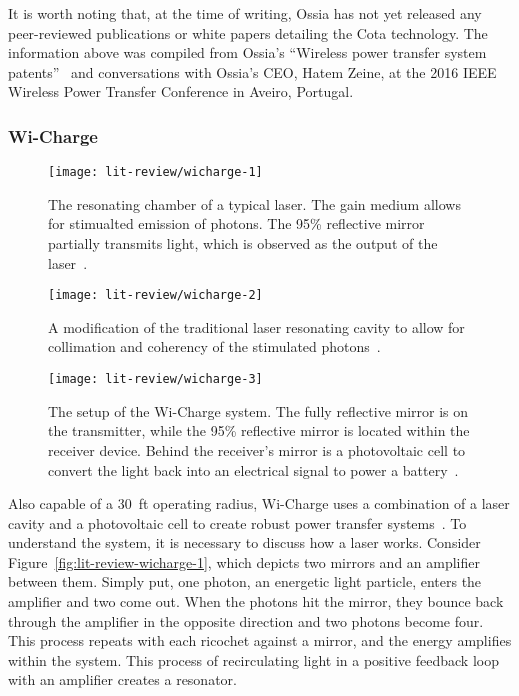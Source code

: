 It is worth noting that, at the time of writing, Ossia has not yet released any peer-reviewed publications or white papers detailing the Cota technology. The information above was compiled from Ossia's ``Wireless power transfer system patents''~\cite{cota-patent} and conversations with Ossia's CEO, Hatem Zeine, at the 2016 IEEE Wireless Power Transfer Conference in Aveiro, Portugal.

\subsubsection{Wi-Charge}

\begin{figure}
\centering
\texttt{[image: lit-review/wicharge-1]}
    \caption[Wi-Charge: Typical laser]{The resonating chamber of a typical laser. The gain medium allows for stimualted emission of photons. The 95\% reflective mirror partially transmits light, which is observed as the output of the laser~\cite{wicharge2016}.}
    \label{fig:lit-review-wicharge-1}

\vspace*{\floatsep}%

\texttt{[image: lit-review/wicharge-2]}
    \caption[Wi-Charge: Modified resonating cavity]{A modification of the traditional laser resonating cavity to allow for collimation and coherency of the stimulated photons~\cite{wicharge2016}.}
    \label{fig:lit-review-wicharge-2}

\vspace*{\floatsep}%

\texttt{[image: lit-review/wicharge-3]}
    \caption[Wi-Charge: Wi-Charge setup]{The setup of the Wi-Charge system. The fully reflective mirror is on the transmitter, while the 95\% reflective mirror is located within the receiver device. Behind the receiver's mirror is a photovoltaic cell to convert the light back into an electrical signal to power a battery~\cite{wicharge2016}.}
    \label{fig:lit-review-wicharge-3}
\end{figure}

Also capable of a 30~ft operating radius, Wi-Charge uses a combination of a laser cavity and a photovoltaic cell to create robust power transfer systems~\cite{wicharge2016}. To understand the system, it is necessary to discuss how a laser works. Consider Figure~\ref{fig:lit-review-wicharge-1}, which depicts two mirrors and an amplifier between them. Simply put, one photon, an energetic light particle, enters the amplifier and two come out. When the photons hit the mirror, they bounce back through the amplifier in the opposite direction and two photons become four. This process repeats with each ricochet against a mirror, and the energy amplifies within the system. This process of recirculating light in a positive feedback loop with an amplifier creates a resonator.

